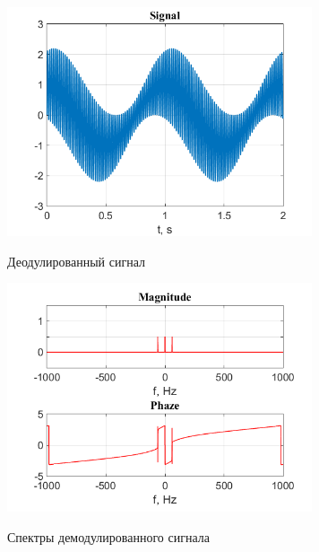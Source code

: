 \documentclass[a4paper,14pt]{article}
\begin{document}
\begin{figure}[h]
\begin{multicols}{1}
\hfill
\includegraphics[width=90mm]{am5}
\hfill
\caption{Деодулированный сигнал}
\label{figBottom}
\hfill
\includegraphics[width=90mm]{am5_spec}
\hfill
\caption{Спектры демодулированного сигнала}
\label{figDown}
\end{multicols}
\end{figure}
\end{document}
